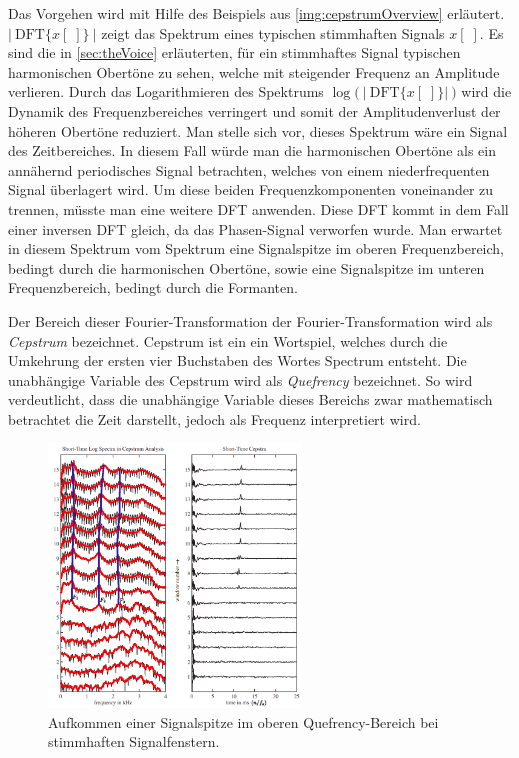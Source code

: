 Das Vorgehen wird mit Hilfe des Beispiels aus \autoref{img:cepstrumOverview} erläutert. $ |\ \text{DFT}\{x[\;]\}\ \big| $  zeigt das Spektrum eines \glqq typischen stimmhaften\grqq{} Signals $x[\;]$. Es sind die in \autoref{sec:theVoice} erläuterten, für ein stimmhaftes Signal typischen harmonischen Obertöne zu sehen, welche mit steigender Frequenz an Amplitude verlieren. Durch das Logarithmieren des Spektrums $\log \big(\ |\ \text{DFT}\{x[\;]\} |\ \big)$ wird die Dynamik des Frequenzbereiches verringert und somit der Amplitudenverlust der höheren Obertöne reduziert. Man stelle sich vor, dieses Spektrum wäre ein Signal des Zeitbereiches. In diesem Fall würde man die harmonischen Obertöne als ein annähernd periodisches Signal betrachten, welches von einem niederfrequenten Signal überlagert wird. Um diese beiden Frequenzkomponenten voneinander zu trennen, müsste man eine weitere DFT anwenden. Diese DFT kommt in dem Fall einer inversen DFT gleich, da das Phasen-Signal verworfen wurde. Man erwartet in diesem \glqq Spektrum vom Spektrum\grqq{} eine Signalspitze im \glqq oberen Frequenzbereich\grqq , bedingt durch die harmonischen Obertöne, sowie eine Signalspitze im \glqq unteren Frequenzbereich\grqq, bedingt durch die Formanten.\cite[\emph{Cepstral analysis}, S. 4]{ricardo_ceps}

Der Bereich dieser \glqq Fourier-Transformation der Fourier-Transformation\grqq{} wird als \emph{Cepstrum} bezeichnet. Cepstrum ist ein ein Wortspiel, welches durch die Umkehrung der ersten vier Buchstaben des Wortes \glqq Spectrum\grqq{} entsteht. Die unabhängige Variable des Cepstrum wird als \emph{Quefrency} bezeichnet. So wird verdeutlicht, dass die unabhängige Variable dieses Bereichs zwar mathematisch betrachtet die Zeit darstellt, jedoch als Frequenz interpretiert wird.\cite[\emph{Cepstral analysis}, S. 7]{ricardo_ceps}

\begin{figure}[h]
	\centering
	\includegraphics[width=0.6\textwidth]{bilder/cepstrum05.png}
	\caption[Aufkommen einer Signalspitze im oberen Quefrency-Bereich]{Aufkommen einer Signalspitze im oberen Quefrency-Bereich bei stimmhaften Signalfenstern. \cite[\emph{Cepstral Analysis}, S. 17]{ricardo_ceps}}
	\label{img:cepstrumVoicedPeak}
\end{figure}	

